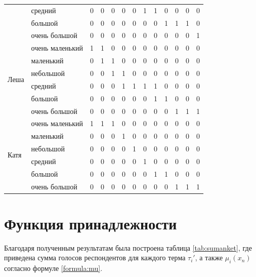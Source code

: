 \begin{table}[!h]
\begin{tabular}{|l|l|l|l|l|l|l|l|l|l|l|l|l|}
                          & средний         & 0 & 0 & 0  & 0  & 0  & 1  & 1  & 0  & 0  & 0  & 0  \\ \cline{2-13} 
                          & большой         & 0 & 0 & 0  & 0  & 0  & 0  & 0  & 1  & 1  & 1  & 0  \\ \cline{2-13} 
                          & очень большой   & 0 & 0 & 0  & 0  & 0  & 0  & 0  & 0  & 0  & 0  & 1  \\ \hline
\multirow{6}{*}{Леша}     & очень маленький & 1 & 1 & 0  & 0  & 0  & 0  & 0  & 0  & 0  & 0  & 0  \\ \cline{2-13} 
                          & маленький       & 0 & 1 & 1  & 0  & 0  & 0  & 0  & 0  & 0  & 0  & 0  \\ \cline{2-13} 
                          & небольшой       & 0 & 0 & 1  & 1  & 0  & 0  & 0  & 0  & 0  & 0  & 0  \\ \cline{2-13} 
                          & средний         & 0 & 0 & 0  & 1  & 1  & 1  & 1  & 0  & 0  & 0  & 0  \\ \cline{2-13} 
                          & большой         & 0 & 0 & 0  & 0  & 0  & 0  & 1  & 1  & 0  & 0  & 0  \\ \cline{2-13} 
                          & очень большой   & 0 & 0 & 0  & 0  & 0  & 0  & 0  & 0  & 1  & 1  & 1  \\ \hline
\multirow{6}{*}{Катя}     & очень маленький & 1 & 1 & 1  & 0  & 0  & 0  & 0  & 0  & 0  & 0  & 0  \\ \cline{2-13} 
                          & маленький       & 0 & 0 & 0  & 1  & 0  & 0  & 0  & 0  & 0  & 0  & 0  \\ \cline{2-13} 
                          & небольшой       & 0 & 0 & 0  & 0  & 1  & 0  & 0  & 0  & 0  & 0  & 0  \\ \cline{2-13} 
                          & средний         & 0 & 0 & 0  & 0  & 0  & 1  & 0  & 0  & 0  & 0  & 0  \\ \cline{2-13} 
                          & большой         & 0 & 0 & 0  & 0  & 0  & 0  & 1  & 1  & 0  & 0  & 0  \\ \cline{2-13} 
                          & очень большой   & 0 & 0 & 0  & 0  & 0  & 0  & 0  & 0  & 1  & 1  & 1  \\ \hline
\end{tabular}
\label{tab:anket2}
\end{table}
\newpage
\section{Функция принадлежности}
\par Благодаря полученным результатам была построена таблица \ref{tab:sumanket}, где приведена сумма голосов респондентов для каждого терма $\tau_i'$, а также $\mu_i(x_n)$ согласно формуле \ref{formula:mu}.


